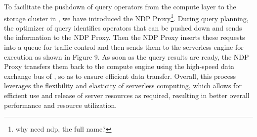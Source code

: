 To facilitate the pushdown of query operators from the compute layer to the storage cluster in \sys, we have introduced the NDP Proxy\footnote{why need ndp, the full name?}. 
 During query planning, the optimizer of  query  identifies operators that can be pushed down and sends the information to the NDP Proxy.  Then the NDP Proxy inserts these requests into a queue for traffic control and then sends them to the serverless engine for execution as shown in Figure 9.
As soon as the query results are ready, the NDP Proxy transfers them back to the compute engine using the high-speed data exchange bus of \sys, so as to ensure efficient data transfer.
Overall,  this process leverages the flexibility and elasticity of serverless computing, which allows for efficient use and release of server resources as required, resulting in better overall performance and resource utilization.



















